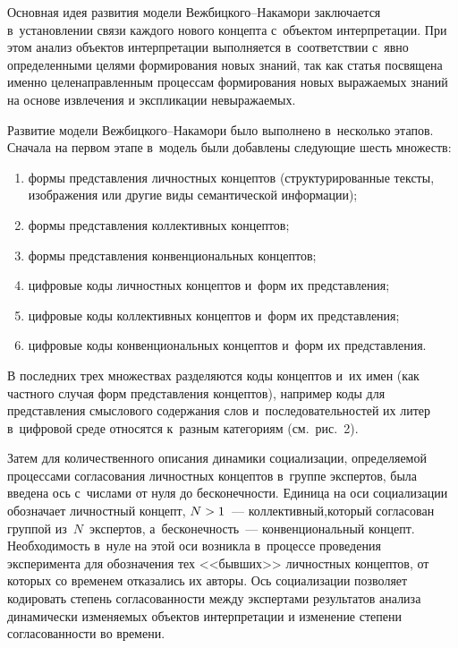 {\begin{multicols}{2}
      Основная идея развития модели Веж\-биц\-ко\-го--На\-ка\-мо\-ри заключается 
      в~установлении связи каж\-до\-го нового концепта с~объектом интерпретации. При этом анализ 
объектов интерпретации выполняется в~соответствии с~явно определенными целями 
формирования новых знаний, так как статья посвящена именно целенаправленным 
процессам формирования новых выражаемых знаний на основе извлечения и экспликации 
невыражаемых.





      Развитие модели Веж\-биц\-ко\-го--На\-ка\-мо\-ри было выполнено в~несколько 
этапов. Сначала на первом этапе в~модель были добавлены следующие шесть множеств:
      \begin{enumerate}[(1)]
\item формы представления личностных концептов (структурированные тексты, 
изображения или другие виды семантической информации);
\item формы представления коллективных концептов;
\item формы представления конвенциональных концептов;
\item цифровые коды личностных концептов и~форм их представления;
\item цифровые коды коллективных концептов и~форм их представления;
\item цифровые коды конвенциональных концептов и~форм их представления.
\end{enumerate}

      В последних трех множествах разделяются коды концептов и~их имен (как частного случая
      форм представления концептов), например 
коды для пред\-став\-ле\-ния смыслового содержания слов и~последовательностей их литер 
в~цифровой среде относятся к~разным категориям (см.\ рис.~2).
      
      Затем для количественного описания динамики социализации, определяемой 
процессами согласования личностных концептов в~группе экспертов, была введена ось 
с~числами от нуля до бесконечности. Единица на оси социализации обозначает\linebreak
 личностный 
концепт, $N\hm>1$~--- коллективный,\linebreak который согласован группой из~$N$~экспертов, 
а~бесконечность~--- конвенциональный концепт. Необходимость в~нуле на этой оси 
возникла в~процессе проведения эксперимента для обозначения тех <<бывших>> 
личностных концептов, от которых со временем отказались их авторы. Ось социализации 
позволяет кодировать степень согласованности между экспертами результатов анализа 
динамически изменяемых объектов интерпретации и изменение степени согласованности во 
времени.
      

\end{multicols}}

